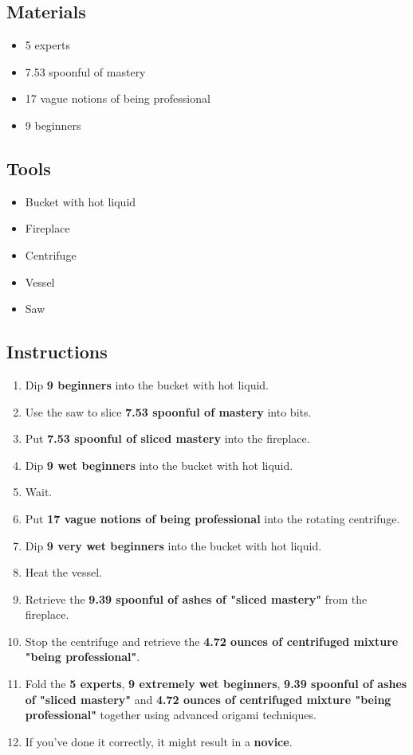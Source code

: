 \documentclass{article}
\begin{document}
\subsection{Materials}\begin{itemize}
\item 
5 experts
\item 
7.53 spoonful of mastery
\item 
17 vague notions of being professional
\item 
9 beginners
\end{itemize}
\subsection{Tools}\begin{itemize}
\item 
Bucket with hot liquid
\item 
Fireplace
\item 
Centrifuge
\item 
Vessel
\item 
Saw
\end{itemize}
\subsection{Instructions}\begin{enumerate}
\item 
Dip \textbf{9 beginners} into the bucket with hot liquid.
\item 
Use the saw to slice \textbf{7.53 spoonful of mastery} into bits.
\item 
Put \textbf{7.53 spoonful of sliced mastery} into the fireplace.
\item 
Dip \textbf{9 wet beginners} into the bucket with hot liquid.
\item 
Wait.
\item 
Put \textbf{17 vague notions of being professional} into the rotating centrifuge.
\item 
Dip \textbf{9 very wet beginners} into the bucket with hot liquid.
\item 
Heat the vessel.
\item 
Retrieve the \textbf{9.39 spoonful of ashes of "sliced mastery"} from the fireplace.
\item 
Stop the centrifuge and retrieve the \textbf{4.72 ounces of centrifuged mixture "being professional"}.
\item 
Fold the \textbf{5 experts}, \textbf{9 extremely wet beginners}, \textbf{9.39 spoonful of ashes of "sliced mastery"} and \textbf{4.72 ounces of centrifuged mixture "being professional"} together using advanced origami techniques.
\item 
If you've done it correctly, it might result in a \textbf{novice}.
\end{enumerate}
\newpage
\end{document}
